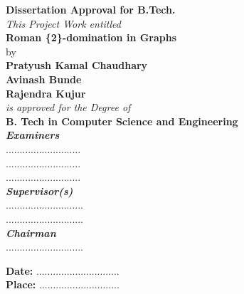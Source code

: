 \begin{center}
\vspace*{1.00cm}
{\Large\bf Dissertation Approval for B.Tech.}\\
\vspace*{1.00cm}
{\em This Project Work entitled}\\
 {\large \textbf {Roman \{2\}-domination in Graphs}\\}
{by}\\
{\bf Pratyush Kamal Chaudhary}\\
{\bf Avinash Bunde}\\
{\bf Rajendra Kujur}\\
{\em is approved for the Degree of }\\
{\textbf {B. Tech in Computer Science and Engineering}\\}
\vspace*{0.5cm}
{\em \bf Examiners\\}
...........................\\
...........................\\
...........................\\
\vspace*{0.5cm}
{\em \bf Supervisor(s)\\}
............................\\
............................\\
\vspace*{0.5cm}
{\em \bf Chairman\\}
............................\\


\vspace*{1.5cm}
\end{center}
\vspace*{1.5cm}
\large{\textbf{Date:} ..............................} \\
\large{\textbf{Place:} .............................}








\newpage

